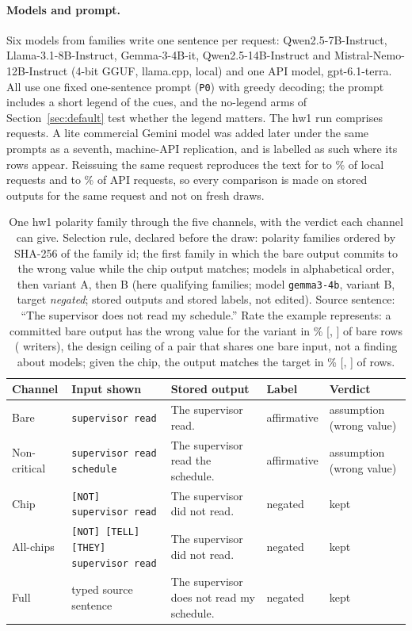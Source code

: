 \paragraph{Models and prompt.}
Six models from \jmbreadthFamilies{} families write one sentence per request: Qwen2.5-7B-Instruct, Llama-3.1-8B-Instruct, Gemma-3-4B-it, Qwen2.5-14B-Instruct and Mistral-Nemo-12B-Instruct (4-bit GGUF, llama.cpp, local) and one API model, gpt-6.1-terra.
All use one fixed one-sentence prompt (\texttt{P0}) with greedy decoding; the prompt includes a short legend of the cues, and the no-legend arms of Section~\ref{sec:default} test whether the legend matters.
The hw1 run comprises \jmhwRequests{} requests.
A lite commercial Gemini model was added later under the same prompts as a seventh, machine-API replication, and is labelled as such where its rows appear.
Reissuing the same request reproduces the text for \jmndLocalMin{} to \jmndLocalMax{}\% of local requests and \jmndApiMin{} to \jmndApiMax{}\% of API requests, so every comparison is made on stored outputs for the same request and not on fresh draws.

\begin{table}[t]
\caption{One hw1 polarity family through the five channels, with the verdict each channel can give. Selection rule, declared before the draw: polarity families ordered by SHA-256 of the family id; the first family in which the bare output commits to the wrong value while the chip output matches; models in alphabetical order, then variant A, then B (here \jmexPolQual{} qualifying families; model \texttt{gemma3-4b}, variant B, target \emph{negated}; stored outputs and stored labels, not edited). Source sentence: ``The supervisor does not read my schedule.'' Rate the example represents: a committed bare output has the wrong value for the variant in \jmexPolWrong{}\% [\jmexPolWrongLo{}, \jmexPolWrongHi{}] of \jmexPolBareN{} bare rows (\jmexPolWriters{} writers), the design ceiling of a pair that shares one bare input, not a finding about models; given the chip, the output matches the target in \jmexPolChip{}\% [\jmexPolChipLo{}, \jmexPolChipHi{}] of \jmexPolChipN{} rows.}
\label{tab:worked}
\small
\setlength{\tabcolsep}{3pt}
\begin{tabular}{@{}l p{3.15cm} p{2.5cm} l l@{}}
\toprule
Channel & Input shown & Stored output & Label & Verdict\\
\midrule
Bare & \texttt{supervisor read} & The supervisor read. & affirmative & assumption (wrong value)\\
Non-critical & \texttt{supervisor read schedule} & The supervisor read the schedule. & affirmative & assumption (wrong value)\\
Chip & \texttt{[NOT] supervisor read} & The supervisor did not read. & negated & kept\\
All-chips & \texttt{[NOT] [TELL] [THEY] supervisor read} & The supervisor did not read. & negated & kept\\
Full & typed source sentence & The supervisor does not read my schedule. & negated & kept\\
\bottomrule
\end{tabular}
\end{table}

